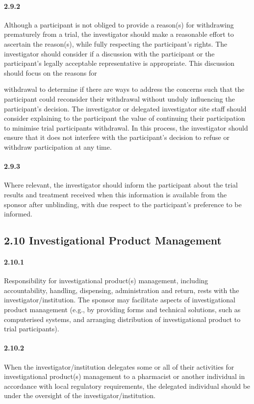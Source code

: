 \documentclass[11pt]{article}
\begin{document}
\paragraph{2.9.2} Although a participant is not obliged to provide a reason(s) for withdrawing prematurely from a trial, the investigator should make a reasonable effort to ascertain the reason(s), while fully respecting the participant's rights. The investigator should consider if a discussion with the participant or the participant's legally acceptable representative is appropriate. This discussion should focus on the reasons for

withdrawal to determine if there are ways to address the concerns such that the participant could reconsider their withdrawal without unduly influencing the participant's decision. The investigator or delegated investigator site staff should consider explaining to the participant the value of continuing their participation to minimise trial participants withdrawal. In this process, the investigator should ensure that it does not interfere with the participant's decision to refuse or withdraw participation at any time.


\paragraph{2.9.3} Where relevant, the investigator should inform the participant about the trial results and treatment received when this information is available from the sponsor after unblinding, with due respect to the participant's preference to be informed.

\subsection{2.10 Investigational Product Management}

\paragraph{2.10.1} Responsibility for investigational product(s) management, including accountability, handling, dispensing, administration and return, rests with the investigator/institution. The sponsor may facilitate aspects of investigational product management (e.g., by providing forms and technical solutions, such as computerised systems, and arranging distribution of investigational product to trial participants).

\paragraph{2.10.2} When the investigator/institution delegates some or all of their activities for investigational product(s) management to a pharmacist or another individual in accordance with local regulatory requirements, the delegated individual should be under the oversight of the investigator/institution.
\end{document}

